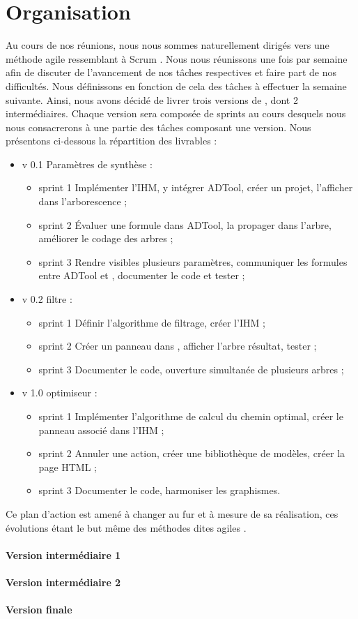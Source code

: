 \section{Organisation}
	\label{sec:livrables}

	Au cours de nos réunions, nous nous sommes naturellement dirigés vers une méthode agile ressemblant à \og Scrum \fg. Nous nous réunissons une fois par semaine afin de discuter de l'avancement de nos tâches respectives et faire part de nos difficultés. Nous définissons en fonction de cela des tâches à effectuer la semaine suivante. Ainsi, nous avons décidé de livrer trois versions de \glasir{}, dont 2 intermédiaires.
	Chaque version sera composée de sprints au cours desquels nous nous consacrerons à une partie des tâches composant une version.
	Nous présentons ci-dessous la répartition des livrables :
	
	\begin{itemize}
		\item{v 0.1} Paramètres de synthèse :
		\begin{itemize}
			\item{sprint 1} Implémenter l'IHM, y intégrer ADTool, créer un projet, l'afficher dans l'arborescence ;
			\item{sprint 2} Évaluer une formule dans ADTool, la propager dans l'arbre, améliorer le codage des arbres ;
			\item{sprint 3} Rendre visibles plusieurs paramètres, communiquer les formules entre ADTool et \glasir{}, documenter le code et tester ;
		\end{itemize}
		\item{v 0.2} filtre :
		\begin{itemize}
			\item{sprint 1} Définir l'algorithme de filtrage, créer l'IHM ;
			\item{sprint 2} Créer un panneau dans \glasir{}, afficher l'arbre résultat, tester ;
			\item{sprint 3} Documenter le code, ouverture simultanée de plusieurs arbres ;
		\end{itemize}
		\item{v 1.0} optimiseur :
		\begin{itemize}
			\item{sprint 1} Implémenter l'algorithme de calcul du chemin optimal, créer le panneau associé dans l'IHM ;
			\item{sprint 2} Annuler une action, créer une bibliothèque de modèles, créer la page HTML ;
			\item{sprint 3} Documenter le code, harmoniser les graphismes.
		\end{itemize}
	\end{itemize}


	Ce plan d'action est amené à changer au fur et à mesure de sa réalisation, ces évolutions étant le but même des méthodes dites \og agiles \fg.
	
	\paragraph{Version intermédiaire 1}


	\paragraph{Version intermédiaire 2}

	\paragraph{Version finale}
